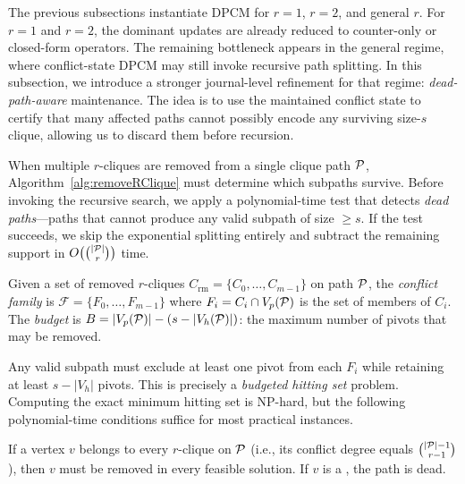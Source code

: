 
\label{sec:opt}

The previous subsections instantiate DPCM for $r{=}1$, $r{=}2$, and general $r$.
%
For $r{=}1$ and $r{=}2$, the dominant updates are already reduced to counter-only or closed-form operators.
%
The remaining bottleneck appears in the general regime, where conflict-state DPCM may still invoke recursive path splitting.
%
In this subsection, we introduce a stronger journal-level refinement for that regime: \emph{dead-path-aware} maintenance.
%
The idea is to use the maintained conflict state to certify that many affected paths cannot possibly encode any surviving size-$s$ clique, allowing us to discard them before recursion.

When multiple $r$-cliques are removed from a single clique path $\TPath$, Algorithm~\ref{alg:removeRClique} must determine which subpaths survive.
Before invoking the recursive search, we apply a polynomial-time test that detects \emph{dead paths}---paths that cannot produce any valid subpath of size $\ge s$.
If the test succeeds, we skip the exponential splitting entirely and subtract the remaining support in $O\bigl(\binom{|\TPath|}{r}\bigr)$ time.

\begin{definition}
Given a set of removed $r$-cliques $C_{\mathrm{rm}} = \{C_0, \dots, C_{m-1}\}$ on path $\TPath$,
the \emph{conflict family} is $\mathcal{F} = \{F_0, \dots, F_{m-1}\}$ where $F_i = C_i \cap V_p(\TPath)$ is the set of \pivot members of $C_i$.
The \emph{budget} is $B = |V_p(\TPath)| - (s - |V_h(\TPath)|)$: the maximum number of pivots that may be removed.
\end{definition}

Any valid subpath must exclude at least one pivot from each $F_i$ while retaining at least $s - |V_h|$ pivots.
This is precisely a \emph{budgeted hitting set} problem.
Computing the exact minimum hitting set is NP-hard, but the following polynomial-time conditions suffice for most practical instances.

\begin{lemma}\label{lem:forced_vertex}
If a vertex $v$ belongs to every $r$-clique on $\TPath$ (i.e., its conflict degree equals $\binom{|\TPath|-1}{r-1}$), then $v$ must be removed in every feasible solution.
If $v$ is a \hold, the path is dead.
\end{lemma}

